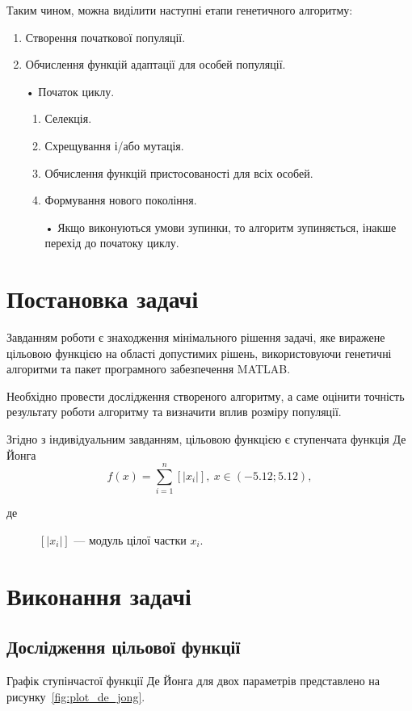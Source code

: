 Таким чином, можна виділити наступні етапи генетичного алгоритму:
\begin{enumerate}
	\item Створення початкової популяції.
	\item Обчислення функцій адаптації для особей популяції.
	\item[• ] Початок циклу.
	\begin{enumerate}
		\item Селекція.
		\item Схрещування і/або мутація.
		\item Обчислення функцій пристосованості для всіх особей.
		\item Формування нового покоління.
		\item[• ] Якщо виконуються умови зупинки, то алгоритм зупиняється, інакше  перехід до початоку циклу.
	\end{enumerate}
\end{enumerate}

\section{Постановка задачі}
Завданням роботи є знаходження мінімального рішення задачі, яке виражене цільовою функцією на області допустимих рішень, використовуючи генетичні алгоритми та пакет програмного забезпечення MATLAB.

Необхідно провести дослідження створеного алгоритму, а саме оцінити точність результату роботи алгоритму та визначити вплив розміру популяції. 

Згідно з індивідуальним завданням, цільовою функцією є ступенчата функція Де Йонга
\[ f(x) = \sum_{i=1}^{n} [|x_i|],\:x\in(-5.12;5.12),\]
\begin{description}
	\item[де] $[|x_i|]$ --- модуль цілої частки $x_i$.
\end{description}

%
%
\section{Виконання задачі}
\subsection{Дослідження цільової функції}
Графік ступінчастої функції Де Йонга для двох параметрів представлено на рисунку~\ref{fig:plot_de_jong}.

